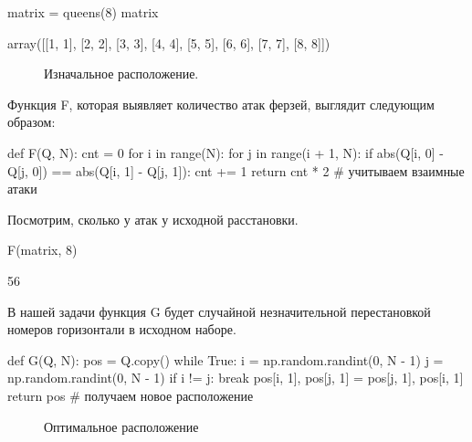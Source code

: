 \begin{pyin}
matrix = queens(8)
matrix
\end{pyin}

\begin{pyout}
array([[1, 1],
       [2, 2],
       [3, 3],
       [4, 4],
       [5, 5],
       [6, 6],
       [7, 7],
       [8, 8]])
\end{pyout}
	
	\newgame
	
	\begin{figure}[ht]
		\begin{center}
			\showboard
			\legend{}
			\caption[Пример \texttt{tikz} схемы]{Изначальное расположение.}
			\label{img:nonopt}
		\end{center}
	\end{figure}
	
	Функция F, которая выявляет количество атак ферзей, выглядит следующим образом:
\begin{pyin}
def F(Q, N):
 cnt = 0
 for i in range(N):
  for j in range(i + 1, N):
    if abs(Q[i, 0] - Q[j, 0]) == abs(Q[i, 1] - Q[j, 1]):
      cnt += 1
 return cnt * 2 # учитываем взаимные атаки
\end{pyin}
	
	Посмотрим, сколько у атак у исходной расстановки.
\begin{pyin}
F(matrix, 8)
\end{pyin}

\begin{pyout}
56
\end{pyout}
	
	В нашей задачи функция G будет случайной незначительной перестановкой номеров горизонтали в исходном наборе.
	
\begin{pyin}
def G(Q, N):
 pos = Q.copy()
 while True:
  i = np.random.randint(0, N - 1)
  j = np.random.randint(0, N - 1)
  if i != j:
    break
 pos[i, 1], pos[j, 1] = pos[j, 1], pos[i, 1]
 return pos # получаем новое расположение
\end{pyin}
	\newgame
	
	\begin{figure}[ht]
		\begin{center}
			\showboard
			\legend{}
			\caption[р]{Оптимальное расположение}
			\label{img:opt}
		\end{center}
	\end{figure}
	
